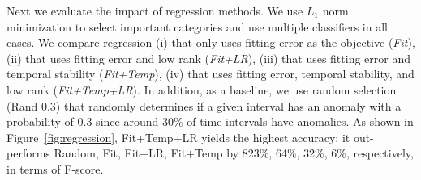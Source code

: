 
 Next we evaluate the impact of
regression methods. We use $L_1$ norm minimization to select important
categories and use multiple classifiers in all cases. We compare
regression (i) that only uses fitting error as the objective ({\em Fit}),
(ii) that uses fitting error and low rank ({\em Fit+LR}),
(iii) that uses fitting error and temporal stability
({\em Fit+Temp}),
(iv) that uses fitting error, temporal stability, and low rank
({\em Fit+Temp+LR}). In addition, as a baseline, we use random
selection (Rand 0.3) that randomly determines if a given interval has an anomaly with a
probability of 0.3 since around 30\% of time intervals have anomalies. 
As shown in Figure~\ref{fig:regression}, Fit+Temp+LR
yields the highest accuracy: it out-performs Random, Fit, Fit+LR,
Fit+Temp by 823\%, 64\%, 32\%, 6\%, respectively, in terms of
F-score.


